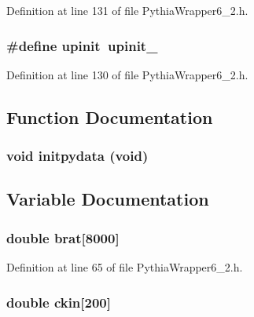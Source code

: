 Definition at line 131 of file Pythia\-Wrapper6\_\-2.h.
\subsubsection{\setlength{\rightskip}{0pt plus 5cm}\#define upinit~upinit\_\-}\label{PythiaWrapper6__2_8h_ba191464953a66f9fa98907b726419cb}




Definition at line 130 of file Pythia\-Wrapper6\_\-2.h.

\subsection{Function Documentation}
\subsubsection{\setlength{\rightskip}{0pt plus 5cm}void initpydata (void)}\label{PythiaWrapper6__2_8h_9616b758c3e53c56be6b5449e9b12038}




\subsection{Variable Documentation}
\subsubsection{\setlength{\rightskip}{0pt plus 5cm}double {\bf brat}[8000]}\label{PythiaWrapper6__2_8h_fd9da107c5053724d4bb1f90994083a4}




Definition at line 65 of file Pythia\-Wrapper6\_\-2.h.
\subsubsection{\setlength{\rightskip}{0pt plus 5cm}double {\bf ckin}[200]}\label{PythiaWrapper6__2_8h_4eb750d408460848ca9485f353ca028a}




